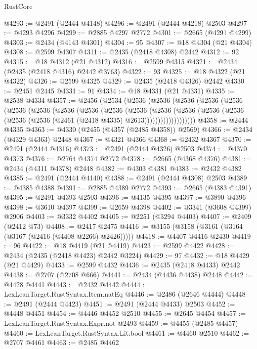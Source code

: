 \begin{lexlean}{RustCore}
\begin{coremodule}
@4293 := @2491 (@2444 @4148)
@4296 := @2491 (@2444 @4218) @2503
@4297 := @4293 @4296
@4299 := @2885 @4297 @2772
@4301 := @2665 (@4291 @4299)
@4303 := @2434 (@4143 @4301)
@4304 := 95
@4307 := @18 @4304 (@21 @4304)
@4308 := @2599 @4307
@4311 := @2435 (@2418 @4308) @2442
@4312 := 92
@4315 := @18 @4312 (@21 @4312)
@4316 := @2599 @4315
@4321 := @2434 (@2435 (@2418 @4316) @2442 @3763)
@4322 := 93
@4325 := @18 @4322 (@21 @4322)
@4326 := @2599 @4325
@4329 := @2435 (@2418 @4326) @2442
@4330 := @2451 @2445
@4331 := 91
@4334 := @18 @4331 (@21 @4331)
@4335 := @2538 @4334
@4357 := @2456
    (@2534
      (@2536
        (@2536
          (@2536
            (@2536
              (@2536
                (@2536
                  (@2536
                    (@2536
                      (@2536
                        (@2536
                          (@2536
                            (@2536
                              (@2536
                                (@2536
                                  (@2536 (@2536 (@2536 (@2461 (@2418 @4335) @2613)))))))))))))))))))
@4358 := @2444 @4335
@4363 := @4330 (@2455 (@4357 (@2485 @4358)) @2569)
@4366 := @2434 (@4329 @4363) @2448
@4367 := @4321 @4366
@4368 := @2432 @4367
@4370 := @2491 (@2444 @4316)
@4373 := @2491 (@2444 @4326) @2503
@4374 := @4370 @4373
@4376 := @2764 @4374 @2772
@4378 := @2665 (@4368 @4376)
@4381 := @2434 (@4311 @4378) @2448
@4382 := @4303 @4381
@4383 := @2432 @4382
@4385 := @2491 (@2444 @4140)
@4388 := @2491 (@2444 @4308) @2503
@4389 := @4385 @4388
@4391 := @2885 @4389 @2772
@4393 := @2665 (@4383 @4391)
@4395 := @2491 @4393 @2503
@4396 := @4135 @4395
@4397 := @3890 @4396
@4398 := @3610 @4397
@4399 := @2659 @4398
@4402 := @3341 (@3608 @4399) @2906
@4403 := @3332 @4402
@4405 := @2251 (@3294 @4403)
@4407 := @2409 (@2412 @73)
@4408 := @2417 @2475
@4416 := @3155 (@3158 (@3161 (@3164 (@3167 (@2416 (@4408 @2266) @2426)))))
@4418 := @4407 @4416 @2430
@4419 := 96
@4422 := @18 @4419 (@21 @4419)
@4423 := @2599 @4422
@4428 := @2434 (@2435 (@2418 @4423) @2442 @3224)
@4429 := 97
@4432 := @18 @4429 (@21 @4429)
@4433 := @2599 @4432
@4436 := @2435 (@2418 @4433) @2442
@4438 := @2707 (@2708 @666)
@4441 := @2434 (@4436 @4438) @2448
@4442 := @4428 @4441
@4443 := @2432 @4442
@4444 := LexLeanTarget.RustSyntax.Item.natEq
@4446 := @2486 (@2646 @4444)
@4448 := @2491 (@2444 @4423)
@4451 := @2491 (@2444 @4433) @2503
@4452 := @4448 @4451
@4454 := @4446 @4452 @2510
@4455 := @2645 @4454
@4457 := LexLeanTarget.RustSyntax.Expr.not @2493
@4459 := @4455 (@2485 @4457)
@4460 := LexLeanTarget.RustSyntax.Lit.bool
@4461 := @4460 @2510
@4462 := @2707 @4461
@4463 := @2485 @4462

\end{coremodule}
\end{lexlean}
